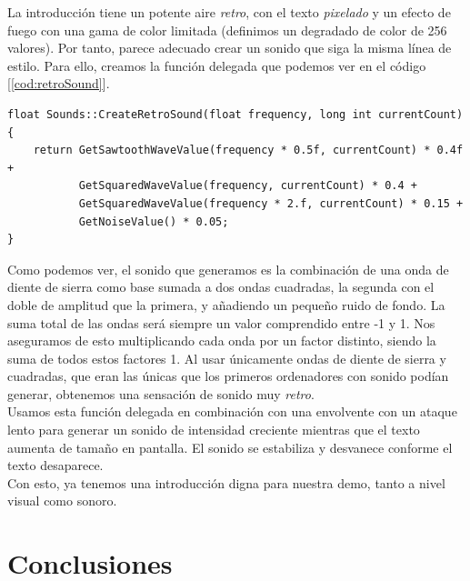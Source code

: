 La introducción tiene un potente aire \emph{retro}, con el texto \emph{pixelado} y un efecto de fuego con una gama de color limitada (definimos un degradado de color de 256 valores). Por tanto, parece adecuado crear un sonido que siga la misma línea de estilo. Para ello, creamos la función delegada que podemos ver en el código [\ref{cod:retroSound}].\\

\begin{lstlisting}[style=C-color, caption={Generación de un sonido retro},label=cod:retroSound, escapechar=|]
float Sounds::CreateRetroSound(float frequency, long int currentCount)
{
    return GetSawtoothWaveValue(frequency * 0.5f, currentCount) * 0.4f +
           GetSquaredWaveValue(frequency, currentCount) * 0.4 +
           GetSquaredWaveValue(frequency * 2.f, currentCount) * 0.15 +
           GetNoiseValue() * 0.05;
}
\end{lstlisting}

Como podemos ver, el sonido que generamos es la combinación de una onda de diente de sierra como base sumada a dos ondas cuadradas, la segunda con el doble de amplitud que la primera, y añadiendo un pequeño ruido de fondo. La suma total de las ondas será siempre un valor comprendido entre -1 y 1. Nos aseguramos de esto multiplicando cada onda por un factor distinto, siendo la suma de todos estos factores 1. Al usar únicamente ondas de diente de sierra y cuadradas, que eran las únicas que los primeros ordenadores con sonido podían generar, obtenemos una sensación de sonido muy \emph{retro}.\\

Usamos esta función delegada en combinación con una envolvente con un ataque lento para generar un sonido de intensidad creciente mientras que el texto aumenta de tamaño en pantalla. El sonido se estabiliza y desvanece conforme el texto desaparece.\\

Con esto, ya tenemos una introducción digna para nuestra demo, tanto a nivel visual como sonoro.\\

\section{Conclusiones}
